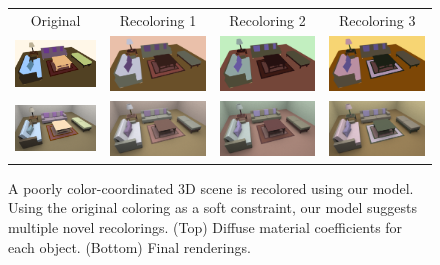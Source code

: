 \begin{figure}[ht]
\begin{tabular}{c|ccc} 
Original&Recoloring 1&Recoloring 2&Recoloring 3\vspace{0.4em}\\
\includegraphics[width=.23\linewidth]{figs/3dscene/original}&\includegraphics[width=.23\linewidth]{figs/3dscene/recolored_17}&\includegraphics[width=.23\linewidth]{figs/3dscene/recolored_03}&\includegraphics[width=.23\linewidth]{figs/3dscene/recolored_15}\vspace{0.4em}\\
\includegraphics[width=.23\linewidth]{figs/3dscene/original_pbrt}&\includegraphics[width=.23\linewidth]{figs/3dscene/recolored_17_pbrt}&\includegraphics[width=.23\linewidth]{figs/3dscene/recolored_03_pbrt}&\includegraphics[width=.23\linewidth]{figs/3dscene/recolored_15_pbrt}\vspace{0.4em}\\
\end{tabular}

\caption{A poorly color-coordinated 3D scene is recolored using our model. Using the original coloring as a soft constraint, our model suggests multiple novel recolorings. (Top) Diffuse material coefficients for each object. (Bottom) Final renderings.}
\label{fig:sceneRecoloring}
\vspace{-1.0em}
\end{figure}

